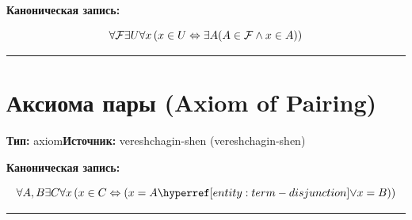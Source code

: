 \documentclass{report}
\begin{document}
\textbf{Каноническая запись:}

\[
\forall{\mathcal{F}}
\exists{U} \forall{x} \left( x \in U \Leftrightarrow \exists{A} (A \in \mathcal{F} \land x \in A) \right)
\]


\vspace{1em}
\hrule
\vspace{1em}

\section{Аксиома пары (Axiom of Pairing)}\label{entity:axm-zfc-pairing}
\textbf{Тип:} axiom\quad \textbf{Источник:} vereshchagin-shen (vereshchagin-shen)

\textbf{Каноническая запись:}

\[
\Forall{A, B}
\mExists{C} \Forall{x} \left( x \in C \mIff (x = A \entityref{term-disjunction}{\lor} x = B) \right)
\]


\vspace{1em}
\hrule
\vspace{1em}
\end{document}
